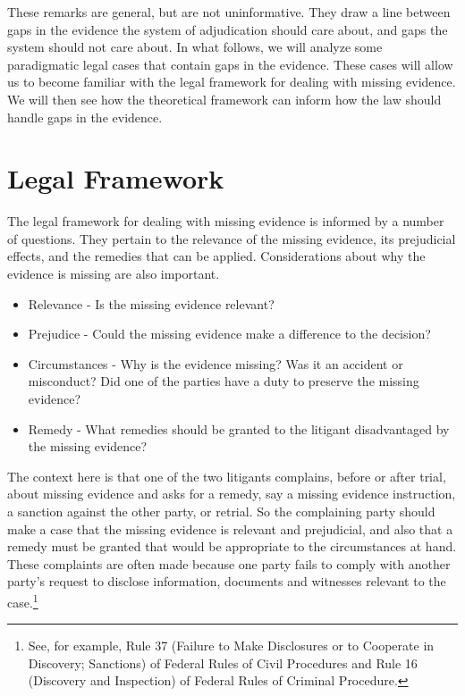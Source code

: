 \documentclass[
  10pt,
  dvipsnames,enabledeprecatedfontcommands]{scrartcl}
\begin{document}
These remarks are general, but are not uninformative. They draw a line
between gaps in the evidence the system of adjudication should care
about, and gaps the system should not care about. In what follows, we
will analyze some paradigmatic legal cases that contain gaps in the
evidence. These cases will allow us to become familiar with the legal
framework for dealing with missing evidence. We will then see how the
theoretical framework can inform how the law should handle gaps in the
evidence.

\hypertarget{legal-framework}{%
\section{Legal Framework}\label{legal-framework}}

The legal framework for dealing with missing evidence is informed by a
number of questions. They pertain to the relevance of the missing
evidence, its prejudicial effects, and the remedies that can be applied.
Considerations about why the evidence is missing are also important.

\begin{itemize}
\item[] Relevance - Is the missing evidence relevant?
\item[] Prejudice - Could the missing evidence make a difference to the decision?
\item[] Circumstances - Why is the evidence missing? Was it an accident or misconduct? Did one of the parties have a duty to preserve the missing evidence?
\item[] Remedy - What remedies should be granted to the litigant disadvantaged 
by the missing evidence?
\end{itemize}

\noindent The context here is that one of the two litigants complains,
before or after trial, about missing evidence and asks for a remedy, say
a missing evidence instruction, a sanction against the other party, or
retrial. So the complaining party should make a case that the missing
evidence is relevant and prejudicial, and also that a remedy must be
granted that would be appropriate to the circumstances at hand. These
complaints are often made because one party fails to comply with another
party's request to disclose information, documents and witnesses
relevant to the case.\footnote{See, for example, Rule 37 (Failure to
  Make Disclosures or to Cooperate in Discovery; Sanctions) of Federal
  Rules of Civil Procedures and Rule 16 (Discovery and Inspection) of
  Federal Rules of Criminal Procedure.}
\end{document}
